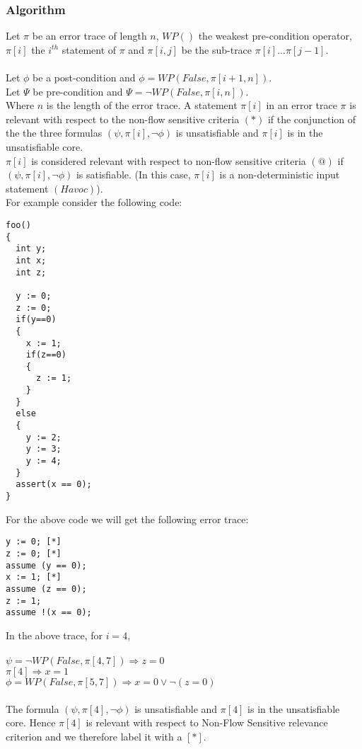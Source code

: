 \documentclass{article}
\begin{document}
\subsubsection{Algorithm}
 Let $\pi$ be an error trace of length $n$, $WP()$ the weakest pre-condition operator, $\pi[i]$ the $i^{th}$ statement of $\pi$ and $\pi[i,j]$ be the sub-trace $\pi[i] . . . \pi[j-1]$.\\
 \\
 Let $\phi$ be a post-condition and $\phi =  WP(False, \pi[i+1,n])$.\\
 Let $\Psi$ be pre-condition and $\Psi = \neg WP(False, \pi[i,n])$.\\
 Where $n$ is the length of the error trace.
A statement $\pi[i]$ in an error trace $\pi$ is relevant with respect to the non-flow sensitive criteria $(*)$ if the conjunction of the the three formulas $(\psi,\pi[i],\neg \phi) $ is unsatisfiable and $\pi[i]$ is in the unsatisfiable core.\\
$\pi[i]$ is considered relevant with respect to non-flow sensitive criteria $(@)$ if  $(\psi,\pi[i],\neg \phi) $ is satisfiable. (In this case, $\pi[i]$ is a non-deterministic input statement $(Havoc)$).\\
For example consider the following code:
\begin{lstlisting}
foo()
{
  int y;
  int x;
  int z;
  
  y := 0;
  z := 0;
  if(y==0) 
  {
    x := 1;
    if(z==0)
    {
      z := 1;
    }
  }
  else 
  {
    y := 2;
    y := 3;
    y := 4;
  }
  assert(x == 0);
}
\end{lstlisting}
For the above code we will get the following error trace:
\begin{lstlisting}
y := 0; [*]
z := 0; [*]
assume (y == 0);
x := 1; [*]
assume (z == 0);
z := 1;
assume !(x == 0);
\end{lstlisting}
In the above trace, for $i=4$,\\
\\
$\psi = \neg WP(False, \pi[4,7]) \Longrightarrow z=0$\\
$\pi[4] \Longrightarrow x=1$\\
$\phi =  WP(False, \pi[5,7]) \Longrightarrow x=0 \vee \neg(z=0)$\\
\\
The formula $(\psi,\pi[4],\neg \phi)$ is unsatisfiable and $\pi[4]$ is in the unsatisfiable core. Hence $\pi[4]$ is relevant with respect to Non-Flow Sensitive relevance criterion and we therefore label it with a $[*]$.
\end{document}

